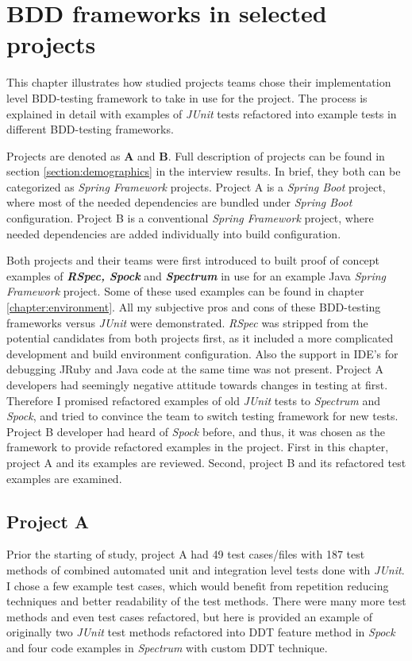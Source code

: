 \chapter{BDD frameworks in selected projects}
\label{chapter:projects}

This chapter illustrates how studied projects teams chose their implementation level BDD-testing
framework to take in use for the project. The process is explained in detail with examples of \textit{JUnit} tests
refactored into example tests in different BDD-testing frameworks.

Projects are denoted as \textbf{A} and \textbf{B}. Full description of projects can be found in section \ref{section:demographics} in the interview
results. In brief, they both can be categorized as \textit{Spring Framework} projects. Project A is a \textit{Spring Boot} project, where
most of the needed dependencies are bundled under \textit{Spring Boot} configuration. Project B is a conventional \textit{Spring Framework} project,
where needed dependencies are added individually into build configuration.

Both projects and their teams were first introduced to built proof of concept examples of \textbf{\textit{RSpec, Spock}} and \textbf{\textit{Spectrum}}
in use for an example Java \textit{Spring Framework} project. Some of these used examples can be found in chapter \ref{chapter:environment}.
All my subjective pros and cons of these BDD-testing frameworks versus \textit{JUnit} were demonstrated. \textit{RSpec} was stripped from the
potential candidates from both projects first, as it included a more complicated development and build environment configuration. Also
the support in IDE's for debugging JRuby and Java code at the same time was not present. Project A developers had
seemingly negative attitude towards changes in testing at first. Therefore I promised refactored examples of old \textit{JUnit}
tests to \textit{Spectrum} and \textit{Spock}, and tried to convince the team to switch testing framework for new tests.
Project B developer had heard of \textit{Spock} before, and thus, it was chosen as the framework to provide refactored examples in the project.
First in this chapter, project A and its examples are reviewed. Second, project B and its refactored test examples are examined.

\label{section:teams}

    \section{Project A}
    Prior the starting of study, project A had 49 test cases/files with 187 test methods of combined automated unit and integration level tests done with \textit{JUnit}.
    I chose a few example test cases, which would benefit from repetition reducing techniques and better readability of the test methods.
    There were many more test methods and even test cases refactored, but here is provided an example of originally two \textit{JUnit}
    test methods refactored into DDT feature method in \textit{Spock} and four code examples in \textit{Spectrum} with custom DDT technique.

